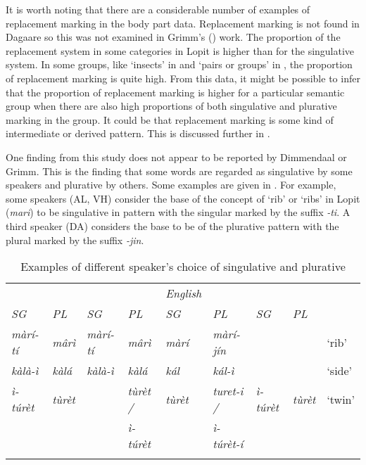\documentclass[output=paper]{langsci/langscibook}
\begin{document}
It is worth noting that there are a considerable number of examples of replacement marking in the body part data. Replacement marking is not found in Dagaare so this was not examined in Grimm’s (\citeyear{Grimm2012}) work. The proportion of the replacement system in some categories in Lopit is higher than for the singulative system.  In some groups, like ‘insects’ in  and  ‘pairs or groups’ in , the proportion of replacement marking is quite high. From this data, it might be possible to infer that the proportion of replacement marking is higher for a particular semantic group when there are also high proportions of both singulative and plurative marking in the group. It could be that replacement marking is some kind of intermediate or derived pattern.  This is discussed further in .

One finding from this study does not appear to be reported by Dimmendaal or Grimm. This is the finding that some words are regarded as singulative by some speakers and plurative by others. Some examples are given in . For example, some speakers (AL, VH) consider the base of the concept of ‘rib’ or ‘ribs’ in Lopit (\textit{mari}) to be singulative in pattern with the singular marked by the suffix \textit{-ti}. A third speaker (DA) considers the base to be of the plurative pattern with the plural marked by the suffix \textit{-jin}. 

\begin{table}
\begin{tabularx}{\textwidth}{>{\itshape}l>{\itshape}l>{\itshape}l>{\itshape}l>{\itshape}l>{\itshape}l>{\itshape}l>{\itshape}ll}
\lsptoprule

\multicolumn{2}{c}{ \textup{AL}} & \multicolumn{2}{c}{ \textup{VH}} & \multicolumn{2}{c}{ \textup{DA}} & \multicolumn{2}{c}{ \textup{JL}} & {English}\\ \cmidrule(lr){1-2}\cmidrule(lr){3-4}\cmidrule(lr){5-6}\cmidrule(lr){7-8}
\textup{SG} & \textup{PL} & \textup{SG} & \textup{PL} & \textup{SG} & \textup{PL} & \textup{SG} & 
 \textup{PL} & \\ \midrule
 màrí-tí &  m\^{a}rì &  màrí-tí &  m\^{a}rì &  màrí &  màrí-jín &  &  & ‘rib’\\
\tablevspace
 kàlà-ì &  kàlá &  kàlà-ì &  kàlá &  kál &  kál-ì &  &  & ‘side’\\
\tablevspace
 ì-túrèt &  tùrèt &  &  tùrèt / & {tùrèt } & {turet-i /}

&  ì-túrèt &  tùrèt & ‘twin’\\
&&&  ì-túrèt &&  ì-túrèt-í & & \\
\lspbottomrule
\end{tabularx}
\caption{Examples of different speaker’s choice of singulative and plurative}
\label{tab:moodie:8}
\end{table}
\end{document}
